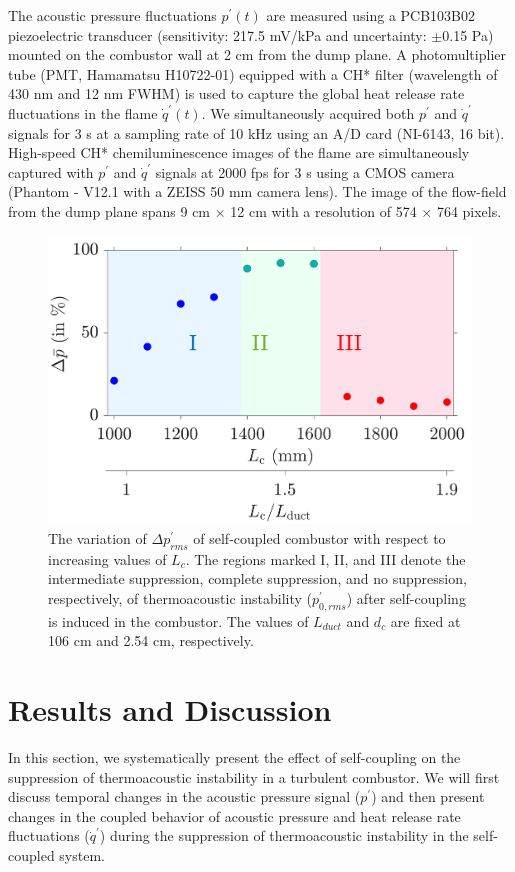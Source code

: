 \documentclass[%
preprint,
 amsmath,amssymb,
 aps,
 pra,
]{revtex4-2}
\begin{document}
The acoustic pressure fluctuations $p^{\prime}(t)$ are measured using a PCB103B02 piezoelectric transducer (sensitivity: 217.5 mV/kPa and uncertainty: $\pm$0.15 Pa) mounted on the combustor wall at 2 cm from the dump plane. A photomultiplier tube (PMT, Hamamatsu H10722-01) equipped with a CH* filter (wavelength of 430 nm and 12 nm FWHM) is used to capture the global heat release rate fluctuations in the flame $\dot{q}^{\prime}(t)$. We simultaneously acquired both $p^{\prime}$  and $\dot{q}^{\prime}$  signals for 3 s at a sampling rate of 10 kHz using an A/D card (NI-6143, 16 bit). High-speed CH* chemiluminescence images of the flame are simultaneously captured with $p^{\prime}$  and $\dot{q}^{\prime}$ signals at 2000 fps for 3 s using a CMOS camera (Phantom - V12.1 with a ZEISS 50 mm camera lens). The image of the flow-field from the dump plane spans 9 cm $\times$ 12 cm with a resolution of 574 $\times$ 764 pixels.

\begin{figure}[t!]
\centering
\includegraphics[width=.8\textwidth]{fig2.png}
\caption{The variation of $\Delta p^\prime_{rms}$ of self-coupled combustor with respect to increasing values of $L_c$. The regions marked I, II, and III denote the intermediate suppression, complete suppression, and no suppression, respectively, of thermoacoustic instability ($p^\prime_{0,rms}$) after self-coupling is induced in the combustor. The values of $L_{duct}$ and $d_c$ are fixed at 106 cm and 2.54 cm, respectively. }
\label{fig2}
\end{figure}

\section{Results and Discussion} \addvspace{10pt}

In this section, we systematically present the effect of self-coupling on the suppression of thermoacoustic instability in a turbulent combustor. We will first discuss temporal changes in the acoustic pressure signal ($p^{\prime}$) and then present changes in the coupled behavior of acoustic pressure and heat release rate fluctuations ($\dot{q}^{\prime}$) during the suppression of thermoacoustic instability in the self-coupled system.  
\end{document}

